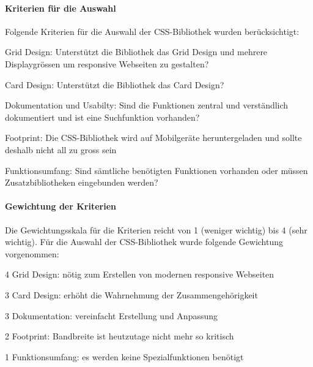 \paragraph*{Kriterien für die Auswahl}
Folgende Kriterien für die Auswahl der CSS-Bibliothek wurden berücksichtigt:
\begin{itemize*}
\item Grid Design: Unterstützt die Bibliothek das Grid Design und mehrere Displaygrössen um responsive Webseiten zu gestalten?
\item Card Design: Unterstützt die Bibliothek das Card Design?
\item Dokumentation und Usabilty: Sind die Funktionen zentral und verständlich dokumentiert und ist eine Suchfunktion vorhanden?
\item Footprint: Die CSS-Bibliothek wird auf Mobilgeräte heruntergeladen und sollte deshalb nicht all zu gross sein
\item Funktionsumfang: Sind sämtliche benötigten Funktionen vorhanden oder müssen Zusatzbibliotheken eingebunden werden?
\end{itemize*}


\paragraph*{Gewichtung der Kriterien}
Die Gewichtungsskala für die Kriterien reicht von 1 (weniger wichtig) bis 4 (sehr wichtig). Für die Auswahl der CSS-Bibliothek wurde folgende Gewichtung vorgenommen:
\begin{itemize*}
\item 4 Grid Design: nötig zum Erstellen von modernen responsive Webseiten
\item 3 Card Design: erhöht die Wahrnehmung der Zusammengehörigkeit
\item 3 Dokumentation: vereinfacht Erstellung und Anpassung
\item 2 Footprint: Bandbreite ist heutzutage nicht mehr so kritisch
\item 1 Funktionsumfang: es werden keine Spezialfunktionen benötigt
\end{itemize*}


